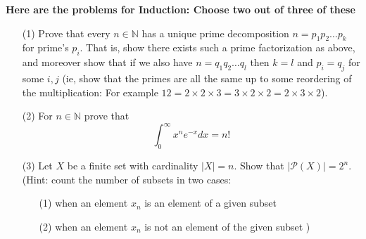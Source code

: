\documentclass[answers,12pt]{exam}
\newcommand{\br}{\hfill \break}
\newcommand{\N}{\mathbb{N}}
\newcommand{\bs}{\begin{solution}}
\newcommand{\es}{\end{solution}}
\begin{document}
\br
\textbf{Here are the problems for Induction: Choose two out of three of these}
\begin{enumerate}
    \item [(1)] Prove that every \(n \in \N\) has a unique prime decomposition \(n = p_1 p_2 \dots p_k\) for prime's \(p_i\). That is, show there exists such a prime factorization as above, and moreover show that if we also have \(n=q_1q_2 \dots q_l\) then \(k=l\) and \(p_i=q_j\) for some \(i, j\) (ie, show that the primes are all the same up to some reordering of the multiplication: For example \(12 =2 \times2 \times 3 = 3 \times 2 \times 2 = 2 \times 3 \times 2\)).
    \bs
    \es
    
    \item [(2)] For \(n \in \N \) prove that \[\int_0^\infty x^n e^{-x}dx = n!\]
    \bs
    \es
    \item [(3)] Let \(X\) be a finite set with cardinality \( |X| = n\). Show that \(|\mathcal{P}(X)| = 2^n\). \\
    (Hint: count the number of subsets in two cases: \begin{enumerate}
        \item [(1)] when an element \(x_n\) is an element of a given subset
        \item [(2)] when an element \(x_n\) is not an element of the given subset )
    \end{enumerate} 
    \bs
    \es
\end{enumerate}
\end{document}

